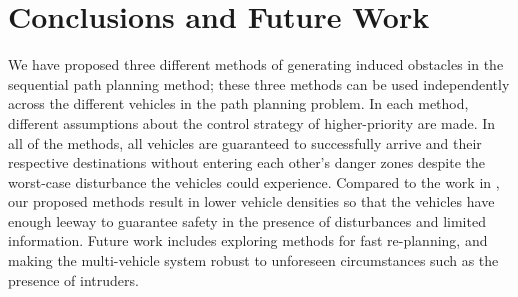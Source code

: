 \section{Conclusions and Future Work}
We have proposed three different methods of generating induced obstacles in the sequential path planning method; these three methods can be used independently across the different vehicles in the path planning problem. In each method, different assumptions about the control strategy of higher-priority are made. In all of the methods, all vehicles are guaranteed to successfully arrive and their respective destinations without entering each other's danger zones despite the worst-case disturbance the vehicles could experience. Compared to the work in \cite{Chen15}, our proposed methods result in lower vehicle densities so that the vehicles have enough leeway to guarantee safety in the presence of disturbances and limited information. Future work includes exploring methods for fast re-planning, and making the multi-vehicle system robust to unforeseen circumstances such as the presence of intruders.